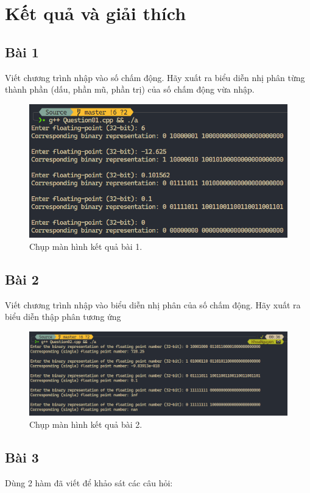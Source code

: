 \newpage
\section{Kết quả và giải thích}
\subsection{Bài 1}
Viết chương trình nhập vào số chấm động. Hãy xuất ra biểu diễn nhị phân từng thành phần (dấu, phần mũ, phần trị) của số chấm động vừa nhập. 
	
\begin{figure}[H]
	\centering
	\includegraphics[width=\textwidth]{images/img1.PNG}
	\caption{Chụp màn hình kết quả bài 1.}
\end{figure}

\subsection{Bài 2}

Viết chương trình nhập vào biểu diễn nhị phân của số chấm động. Hãy xuất ra biểu diễn thập 
phân tương ứng

\begin{figure}[H]
	\centering
	\includegraphics[width=\textwidth]{images/img2.PNG}
	\caption{Chụp màn hình kết quả bài 2.}
\end{figure}

\subsection{Bài 3}
Dùng 2 hàm đã viết để khảo sát các câu hỏi: 

